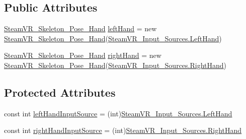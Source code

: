 \subsection*{Public Attributes}
\begin{DoxyCompactItemize}
\item 
\mbox{\hyperlink{class_valve_1_1_v_r_1_1_steam_v_r___skeleton___pose___hand}{Steam\+V\+R\+\_\+\+Skeleton\+\_\+\+Pose\+\_\+\+Hand}} \mbox{\hyperlink{class_valve_1_1_v_r_1_1_steam_v_r___skeleton___pose_a12251bc65a0ffc475284ce742b482b61}{left\+Hand}} = new \mbox{\hyperlink{class_valve_1_1_v_r_1_1_steam_v_r___skeleton___pose___hand}{Steam\+V\+R\+\_\+\+Skeleton\+\_\+\+Pose\+\_\+\+Hand}}(\mbox{\hyperlink{namespace_valve_1_1_v_r_a82e5bf501cc3aa155444ee3f0662853fa03f7bbbc02c9006ea393ec4ef5843d7b}{Steam\+V\+R\+\_\+\+Input\+\_\+\+Sources.\+Left\+Hand}})
\item 
\mbox{\hyperlink{class_valve_1_1_v_r_1_1_steam_v_r___skeleton___pose___hand}{Steam\+V\+R\+\_\+\+Skeleton\+\_\+\+Pose\+\_\+\+Hand}} \mbox{\hyperlink{class_valve_1_1_v_r_1_1_steam_v_r___skeleton___pose_a8363d4bc4bbc5ea72174b6e60ddec071}{right\+Hand}} = new \mbox{\hyperlink{class_valve_1_1_v_r_1_1_steam_v_r___skeleton___pose___hand}{Steam\+V\+R\+\_\+\+Skeleton\+\_\+\+Pose\+\_\+\+Hand}}(\mbox{\hyperlink{namespace_valve_1_1_v_r_a82e5bf501cc3aa155444ee3f0662853faa51983e0f69f76a68e55efe2e7b700b5}{Steam\+V\+R\+\_\+\+Input\+\_\+\+Sources.\+Right\+Hand}})
\end{DoxyCompactItemize}
\subsection*{Protected Attributes}
\begin{DoxyCompactItemize}
\item 
const int \mbox{\hyperlink{class_valve_1_1_v_r_1_1_steam_v_r___skeleton___pose_a0f736b8493f8e11c7fdd3a7e8f28f596}{left\+Hand\+Input\+Source}} = (int)\mbox{\hyperlink{namespace_valve_1_1_v_r_a82e5bf501cc3aa155444ee3f0662853fa03f7bbbc02c9006ea393ec4ef5843d7b}{Steam\+V\+R\+\_\+\+Input\+\_\+\+Sources.\+Left\+Hand}}
\item 
const int \mbox{\hyperlink{class_valve_1_1_v_r_1_1_steam_v_r___skeleton___pose_a4de49ef44e92db696b5ad38064a0983f}{right\+Hand\+Input\+Source}} = (int)\mbox{\hyperlink{namespace_valve_1_1_v_r_a82e5bf501cc3aa155444ee3f0662853faa51983e0f69f76a68e55efe2e7b700b5}{Steam\+V\+R\+\_\+\+Input\+\_\+\+Sources.\+Right\+Hand}}
\end{DoxyCompactItemize}


